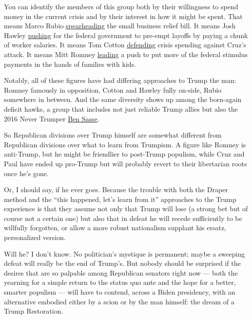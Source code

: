 You can identify the members of this group both by their willingness to
spend money in the current crisis and by their interest in how it might
be spent. That means Marco Rubio
\href{https://www.rubio.senate.gov/public/index.cfm/2020/7/rubio-collins-introduce-phase-iv-small-business-relief-package}{spearheading}
the small business relief bill. It means Josh Hawley
\href{https://www.hawley.senate.gov/sites/default/files/2020-04/Getting-America-Back-to-Work_0.pdf}{pushing}
for the federal government to pre-empt layoffs by paying a chunk of
worker salaries. It means Tom Cotton
\href{https://www.washingtonpost.com/politics/2020/07/22/daily-202-cruz-vs-cotton-clash-coronavirus-deficits-may-preview-2024-contest-post-trump-gop/}{defending}
crisis spending against Cruz's attack. It means Mitt Romney
\href{https://www.romney.senate.gov/romney-cassidy-daines-rubio-call-family-focused-economic-impact-payments-coronavirus-relief}{leading}
a push to put more of the federal stimulus payments in the hands of
families with kids.

Notably, all of these figures have had differing approaches to Trump the
man: Romney famously in opposition, Cotton and Hawley fully on-side,
Rubio somewhere in between. And the same diversity shows up among the
born-again deficit hawks, a group that includes not just reliable Trump
allies but also the 2016 Never Trumper
\href{https://www.sasse.senate.gov/public/index.cfm/2020/7/sasse-statement-on-intra-democratic-mnuchin-pelosi-negotiations}{Ben
Sasse}.

So Republican divisions over Trump himself are somewhat different from
Republican divisions over what to learn from Trumpism. A figure like
Romney is anti-Trump, but he might be friendlier to post-Trump populism,
while Cruz and Paul have ended up pro-Trump but will probably revert to
their libertarian roots once he's gone.

Or, I should say, if he ever goes. Because the trouble with both the
Draper method and the ``this happened, let's learn from it'' approaches
to the Trump experience is that they assume not only that Trump will
lose (a strong bet but of course not a certain one) but also that in
defeat he will recede sufficiently to be willfully forgotten, or allow a
more robust nationalism supplant his ersatz, personalized version.

Will he? I don't know. No politician's mystique is permanent; maybe a
sweeping defeat will really be the end of Trump's. But nobody should be
surprised if the desires that are so palpable among Republican senators
right now --- both the yearning for a simple return to the status quo
ante and the hope for a better, smarter populism --- will have to
contend, across a Biden presidency, with an alternative embodied either
by a scion or by the man himself: the dream of a Trump Restoration.

